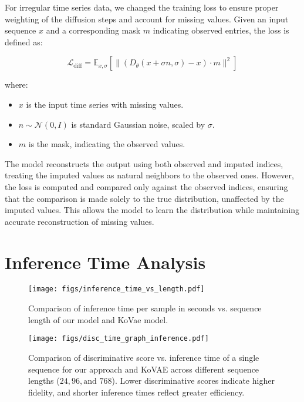 \documentclass{article}
\theoremstyle{plain}
\theoremstyle{definition}
\theoremstyle{remark}
\begin{document}
{For irregular time series data, we changed the training loss to ensure proper weighting of the diffusion steps and account for missing values. Given an input sequence \( x \) and a corresponding mask \( m \) indicating observed entries, the loss is defined as:

\begin{equation}
    \mathcal{L}_{\text{diff}} = \mathbb{E}_{x, \sigma} \left[ \| (D_\theta(x + \sigma n, \sigma) - x) \cdot m \|^2 \right]
\end{equation}

where:

\begin{itemize}
    \item $ x $ is the input time series with missing values.
    \item $ n \sim \mathcal{N}(0, I) $ is standard Gaussian noise, scaled by $ \sigma $.
    \item $ m $ is the mask, indicating the observed values.
\end{itemize}

The model reconstructs the output using both observed and imputed indices, treating the imputed values as natural neighbors to the observed ones. However, the loss is computed and compared only against the observed indices, ensuring that the comparison is made solely to the true distribution, unaffected by the imputed values. This allows the model to learn the distribution while maintaining accurate reconstruction of missing values.

\section{Inference Time Analysis}

\begin{figure}[!b]
    \centering
    \begin{minipage}[t]{0.48\linewidth} %
        \centering
        \texttt{[image: figs/inference\_time\_vs\_length.pdf]}
        \vspace{-5mm}
        \caption{Comparison of inference time per sample in seconds vs. sequence length of our model and KoVae model.}
        \label{fig:inference_time_vs_length}
    \end{minipage}
    \hfill
    \begin{minipage}[t]{0.487\linewidth} %
        \centering
        \texttt{[image: figs/disc\_time\_graph\_inference.pdf]}
        \vspace{-5mm}
        \caption{Comparison of discriminative score vs. inference time of a single sequence for our approach and KoVAE across different sequence lengths ($24, 96, \text{and } 768$). Lower discriminative scores indicate higher fidelity, and shorter inference times reflect greater efficiency.}
        \label{fig:disc_time_graph_inference}
    \end{minipage}
\end{figure}




}
\end{document}
